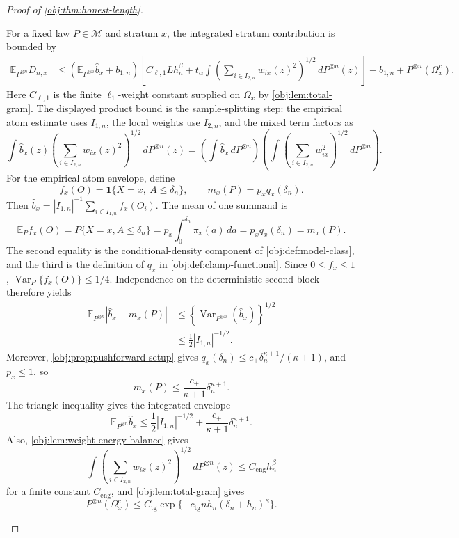 \documentclass[11pt]{article}
\begin{document}
\begin{proof}[Proof of \cref{obj:thm:honest-length}]
\begin{enumerate}
For a fixed law \(P\in\mathcal M\) and stratum \(x\), the integrated stratum contribution is bounded by
\[
\begin{aligned}
\mathbb E_{P^{\otimes n}}D_{n,x}
&\le
\left(\mathbb E_{P^{\otimes n}}\widehat b_x+b_{1,n}\right)
\left[ C_{\ell,1}Lh_n^\beta
+t_\alpha
\int
\left(\sum_{i\in I_{2,n}}w_{ix}(z)^2\right)^{1/2}
\,dP^{\otimes n}(z)
\right]
+b_{1,n}+P^{\otimes n}(\Omega_x^c) .
\end{aligned}
\]
Here \(C_{\ell,1}\) is the finite \(\ell_1\)-weight constant supplied on \(\Omega_x\) by
\cref{obj:lem:total-gram}. The displayed product bound is the sample-splitting step: the empirical atom
estimate uses \(I_{1,n}\), the local weights use \(I_{2,n}\), and the mixed term factors as
\[
\int \widehat b_x(z)
\left(\sum_{i\in I_{2,n}}w_{ix}(z)^2\right)^{1/2}
\,dP^{\otimes n}(z)
=
\left(\int\widehat b_x\,dP^{\otimes n}\right)
\left(\int
\left(\sum_{i\in I_{2,n}}w_{ix}^2\right)^{1/2}
\,dP^{\otimes n}\right).
\]
For the empirical atom envelope, define
\[
f_x(O)=\mathbf 1\{X=x,\ A\leq\delta_n\},
\qquad
m_x(P)=p_xq_x(\delta_n).
\]
Then \(\widehat b_x=|I_{1,n}|^{-1}\sum_{i\in I_{1,n}}f_x(O_i)\). The mean of one summand is
\[
\mathbb E_P f_x(O)
=P\{X=x,A\leq\delta_n\}
=p_x\int_0^{\delta_n}\pi_x(a)\,da
=p_xq_x(\delta_n)
=m_x(P).
\]
The second equality is the conditional-density component of \cref{obj:def:model-class}, and the third is the definition of \(q_x\) in \cref{obj:def:clamp-functional}.
Since \(0\leq f_x\leq1\), \(\operatorname{Var}_P\{f_x(O)\}\leq1/4\). Independence on the deterministic second block therefore yields
\[
\begin{aligned}
\mathbb E_{P^{\otimes n}}
\left|\widehat b_x-m_x(P)\right|
&\leq
\left\{\operatorname{Var}_{P^{\otimes n}}(\widehat b_x)\right\}^{1/2}  \\
&\leq
\frac12 |I_{1,n}|^{-1/2}.
\end{aligned}
\]
Moreover, \cref{obj:prop:pushforward-setup} gives
\(q_x(\delta_n)\leq c_+\delta_n^{\kappa+1}/(\kappa+1)\), and \(p_x\leq1\), so
\[
m_x(P)\leq \frac{c_+}{\kappa+1}\delta_n^{\kappa+1}.
\]
The triangle inequality gives the integrated envelope
\[
\mathbb E_{P^{\otimes n}}\widehat b_x
\le
\frac12 |I_{1,n}|^{-1/2}
+
\frac{c_+}{\kappa+1}\delta_n^{\kappa+1}.
\]
Also, \cref{obj:lem:weight-energy-balance} gives
\[
\int
\left(\sum_{i\in I_{2,n}}w_{ix}(z)^2\right)^{1/2}
\,dP^{\otimes n}(z)
\le C_{\mathrm{eng}}h_n^\beta
\]
for a finite constant \(C_{\mathrm{eng}}\), and \cref{obj:lem:total-gram} gives
\[
P^{\otimes n}(\Omega_x^c)
\le
C_{\mathrm{tg}}\exp\{-c_{\mathrm{tg}}n h_n(\delta_n+h_n)^\kappa\}.
\]
\end{enumerate}
\end{proof}
\end{document}
